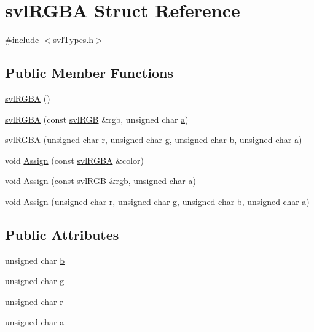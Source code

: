 \hypertarget{structsvl_r_g_b_a}{}\section{svl\+R\+G\+B\+A Struct Reference}
\label{structsvl_r_g_b_a}


{\ttfamily \#include $<$svl\+Types.\+h$>$}

\subsection*{Public Member Functions}
\begin{DoxyCompactItemize}
\item 
\hyperlink{structsvl_r_g_b_a_a77a335beeeafa24e617e9ca764c421d7}{svl\+R\+G\+B\+A} ()
\item 
\hyperlink{structsvl_r_g_b_a_ae163b898a73c688b4f8a7f234fbc6538}{svl\+R\+G\+B\+A} (const \hyperlink{structsvl_r_g_b}{svl\+R\+G\+B} \&rgb, unsigned char \hyperlink{structsvl_r_g_b_a_a013e40506e5c6adcec1dc614b2634c76}{a})
\item 
\hyperlink{structsvl_r_g_b_a_a314c3f93830210f37ea3060192d923f3}{svl\+R\+G\+B\+A} (unsigned char \hyperlink{structsvl_r_g_b_a_a851a1703a424dd9d4330eb669094e991}{r}, unsigned char \hyperlink{structsvl_r_g_b_a_a367a65b4b35bc3b855a6d818c843d02f}{g}, unsigned char \hyperlink{structsvl_r_g_b_a_a7c139a15f87df0e403d602573029f063}{b}, unsigned char \hyperlink{structsvl_r_g_b_a_a013e40506e5c6adcec1dc614b2634c76}{a})
\item 
void \hyperlink{structsvl_r_g_b_a_ac7059121c29b2ac38b101b3908d408ed}{Assign} (const \hyperlink{structsvl_r_g_b_a}{svl\+R\+G\+B\+A} \&color)
\item 
void \hyperlink{structsvl_r_g_b_a_a7fd2cd35b305bb6d95ed5a98f500565d}{Assign} (const \hyperlink{structsvl_r_g_b}{svl\+R\+G\+B} \&rgb, unsigned char \hyperlink{structsvl_r_g_b_a_a013e40506e5c6adcec1dc614b2634c76}{a})
\item 
void \hyperlink{structsvl_r_g_b_a_a43f30bf0bfadabc00f7d0a4dbeb22ceb}{Assign} (unsigned char \hyperlink{structsvl_r_g_b_a_a851a1703a424dd9d4330eb669094e991}{r}, unsigned char \hyperlink{structsvl_r_g_b_a_a367a65b4b35bc3b855a6d818c843d02f}{g}, unsigned char \hyperlink{structsvl_r_g_b_a_a7c139a15f87df0e403d602573029f063}{b}, unsigned char \hyperlink{structsvl_r_g_b_a_a013e40506e5c6adcec1dc614b2634c76}{a})
\end{DoxyCompactItemize}
\subsection*{Public Attributes}
\begin{DoxyCompactItemize}
\item 
unsigned char \hyperlink{structsvl_r_g_b_a_a7c139a15f87df0e403d602573029f063}{b}
\item 
unsigned char \hyperlink{structsvl_r_g_b_a_a367a65b4b35bc3b855a6d818c843d02f}{g}
\item 
unsigned char \hyperlink{structsvl_r_g_b_a_a851a1703a424dd9d4330eb669094e991}{r}
\item 
unsigned char \hyperlink{structsvl_r_g_b_a_a013e40506e5c6adcec1dc614b2634c76}{a}
\end{DoxyCompactItemize}


